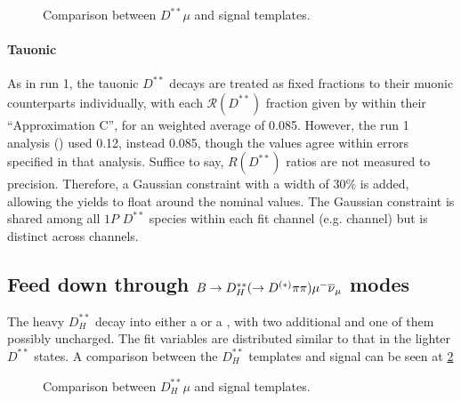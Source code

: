 \begin{figure}[htb]

    \caption{Comparison between $D^{**}\mu$ and \Dz\taum signal templates.}
    \label{fig:dstst-mu-vs-d0-sig}
\end{figure}

\paragraph{Tauonic}
As in run 1, the tauonic $D^{**}$ decays are treated as fixed fractions
to their muonic counterparts individually, with each $\mathcal{R}(D^{**})$
fraction given by \cite{Bernlochner_2018} within their ``Approximation C'',
for an weighted average of 0.085.
However, the run 1 \RDst analysis (\cite{LHCb-ANA-2014-052}) used
0.12, instead 0.085,
though the values agree within errors specified in that analysis.
Suffice to say, $R(D^{**})$ ratios are not measured to precision.
Therefore, a Gaussian constraint with a width of 30\% is added,
allowing the yields to float around the nominal values.
The Gaussian constraint is shared among all $1P$ $D^{**}$ species within
each fit channel (e.g. \Dz channel) but is distinct across channels.


\subsection{Feed down through $B \rightarrow D_H^{**}(\rightarrow D^{(*)}\pi\pi){\mu^-}{{\overline{\nu}}_\mu}$ modes}

The heavy $D_H^{**}$ decay into either a \Dz or a \Dstar, with two additional
\pion and one of them possibly uncharged.
The fit variables are distributed similar to that in the lighter
$D^{**}$ states.
A comparison between the $D_H^{**}$ templates and \Dz\taum signal can be
seen at \ref{fig:dstst-heavy-vs-d0-sig}

\begin{figure}[htb]

    \caption{Comparison between $D_H^{**}\mu$ and \Dz\taum signal templates.}
    \label{fig:dstst-heavy-vs-d0-sig}
\end{figure}


